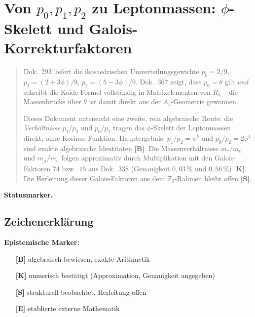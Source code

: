 
\providecommand{\BM}{\textbf{[B]}}
\providecommand{\KM}{\textbf{[K]}}
\providecommand{\SM}{\textbf{[S]}}
\providecommand{\EM}{\textbf{[E]}}

\chapter*{Von $p_0,p_1,p_2$ zu Leptonmassen: $\phi$-Skelett und Galois-Korrekturfaktoren}

\begin{abstract}
Dok.~293 liefert die ikosaedrischen Umverteilungsgewichte $p_0=2/9$,
$p_1=(2{+}3\phi)/9$, $p_2=(5{-}3\phi)/9$. Dok.~367 zeigt, dass $p_0=\theta$
gilt \emph{und} schreibt die Koide-Formel vollständig in Matrixelementen von
$R_5$ -- die Massenbrücke über $\theta$ ist damit direkt aus der $A_5$-Geometrie
gewonnen.

Dieses Dokument untersucht eine zweite, rein algebraische Route: die
\emph{Verhältnisse} $p_1/p_2$ und $p_0/p_2$ tragen das $\phi$-Skelett der
Leptonmassen direkt, ohne Kosinus-Funktion.
Hauptergebnis: $p_1/p_2 = \phi^8$ und $p_0/p_2 = 2\phi^4$ sind exakte algebraische
Identitäten \BM. Die Massenverhältnisse $m_\tau/m_e$ und $m_\mu/m_e$ folgen
approximativ durch Multiplikation mit den Galois-Faktoren $74$ bzw.\ $15$ aus
Dok.~338 (Genauigkeit $0{,}03\,\%$ und $0{,}56\,\%$) \KM. Die Herleitung dieser
Galois-Faktoren aus dem $\mathbb{Z}_3$-Rahmen bleibt offen \SM.
\end{abstract}
\medskip\noindent\textbf{Statusmarker.}



\section*{Zeichenerklärung}

\textbf{Epistemische Marker:}
\begin{itemize}[leftmargin=2em,itemsep=0pt,topsep=2pt]
  \item[\textbf{[B]}] algebraisch bewiesen, exakte Arithmetik
  \item[\textbf{[K]}] numerisch bestätigt (Approximation, Genauigkeit angegeben)
  \item[\textbf{[S]}] strukturell beobachtet, Herleitung offen
  \item[\textbf{[E]}] etablierte externe Mathematik
\end{itemize}


